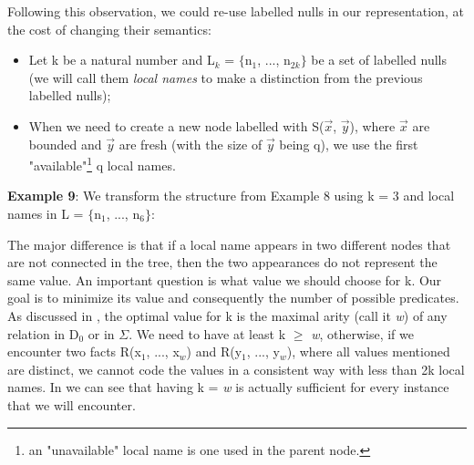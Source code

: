 \documentclass[11pt, a4paper, dvipsnames]{article}
\begin{document}
Following this observation, we could re-use labelled nulls in our representation, at the cost of changing their semantics:
\begin{itemize}
	\item Let k be a natural number and L$_{k}$ = $\{$n$_{1}$, ..., n$_{2k}\}$ be a set of labelled nulls (we will call them \textit{local names} to make a distinction from the previous labelled nulls);
	\item When we need to create a new node labelled with S($\vec{x}$, $\vec{y}$), where $\vec{x}$ are bounded and $\vec{y}$ are fresh (with the size of $\vec{y}$ being q), we use the first "available"\footnote{an "unavailable" local name is one used in the parent node.} q local names. 
\end{itemize} 
\textbf{Example 9}: We transform the structure from Example 8 using k = 3 and local names in L = $\{$n$_{1}$, ..., n$_{6}\}$:
\begin{center}
\end{center}
The major difference is that if a local name appears in two different nodes that are not connected in the tree, then the two appearances do not represent the same value.\newline
An important question is what value we should choose for k. Our goal is to minimize its value and consequently the number of possible predicates. As discussed in \cite{decidable}, the optimal value for k is the maximal arity (call it \textit{w}) of any relation in D$_{0}$ or in $\Sigma$.\newline
We need to have at least k $\geq$ \textit{w}, otherwise, if we encounter two facts R(x$_{1}$, ..., x$_{w}$) and R(y$_{1}$, ..., y$_{w}$), where all values mentioned are distinct, we cannot code the values in a consistent way with less than 2k local names. In \cite{decidable} we can see that having k = \textit{w} is actually sufficient for every instance that we will encounter.\newline
\end{document}
